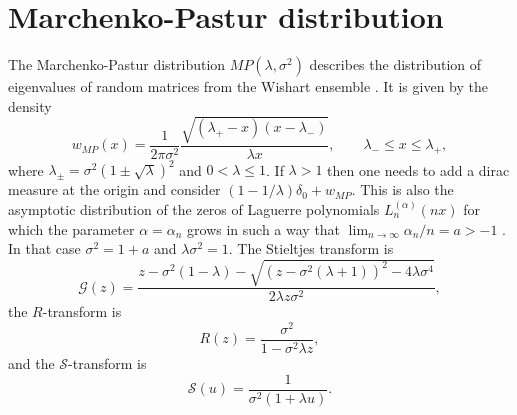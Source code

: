 \documentclass[12pt]{article}
\newcommand{\St}{\mathcal{S}} %
\newcommand{\Gt}{\mathcal{G}} %
\numberwithin{equation}{section}
\begin{document}
\section{Marchenko-Pastur distribution}
The Marchenko-Pastur distribution $MP(\lambda,\sigma^2)$ describes the distribution of eigenvalues of random matrices from the Wishart ensemble \cite{Marchenko-Pastur}. It is given by the density
\begin{equation}  \label{MP}
   w_{MP}(x) = \frac{1}{2\pi \sigma^2} \frac{\sqrt{(\lambda_+-x)(x-\lambda_-)}}{\lambda x}, \qquad
   \lambda_- \leq x \leq \lambda_+, 
\end{equation}
where $\lambda_{\pm} = \sigma^2(1\pm \sqrt{\lambda})^2$ and $0 <\lambda \leq 1$. If $\lambda >1$ then
one needs to add a dirac measure at the origin and consider $(1-1/\lambda)\delta_0 + w_{MP}$.
This is also the asymptotic distribution of the zeros of Laguerre polynomials $L_n^{(\alpha)}(nx)$
for which the parameter $\alpha=\alpha_n$ grows in such a way that 
$\lim_{n \to \infty} \alpha_n/n = a > -1$ \cite{Gawronski-Shawyer}.
In that case $\sigma^2=1+a$ and $\lambda \sigma^2 = 1$.
The Stieltjes transform is
\begin{equation}   \label{MP-G}
    \Gt(z) = \frac{z-\sigma^2(1-\lambda)-\sqrt{(z-\sigma^2(\lambda+1))^2-4\lambda \sigma^4}}
      {2\lambda z \sigma^2},  
\end{equation}
the $R$-transform is
\begin{equation}  \label{PM-R}
     R(z) = \frac{\sigma^2}{1-\sigma^2 \lambda z}, 
\end{equation}
and the $\St$-transform is
\begin{equation}   \label{MP-S}
      \St(u) = \frac{1}{\sigma^2(1+\lambda u)}.
\end{equation}
                 
\end{document}
